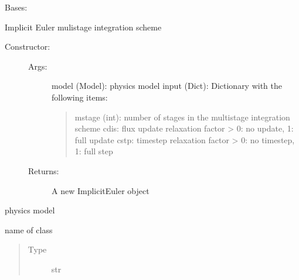 \documentclass[letterpaper,10pt,english]{sphinxmanual}
\begin{document}
\begin{fulllineitems}
\label{\detokenize{autoapi/ImplicitEuler/index:ImplicitEuler.ImplicitEuler}}
\sphinxAtStartPar
Bases: 

\sphinxAtStartPar
Implicit Euler mulistage integration scheme
\begin{description}
\item[{Constructor:}] \leavevmode\begin{description}
\item[{Args:}] \leavevmode
\sphinxAtStartPar
model (Model): physics model
input (Dict): Dictionary with the following items:
\begin{quote}

\sphinxAtStartPar
mstage (int):   number of stages in the multistage integration scheme
cdis:           flux update relaxation factor \textendash{}\textgreater{} 0: no update, 1: full update
cstp:           timestep relaxation factor \textendash{}\textgreater{} 0: no timestep, 1: full step
\end{quote}

\item[{Returns:}] \leavevmode
\sphinxAtStartPar
A new ImplicitEuler object

\end{description}

\end{description}

\begin{fulllineitems}
\label{\detokenize{autoapi/ImplicitEuler/index:ImplicitEuler.ImplicitEuler.Model}}
\sphinxAtStartPar
physics model

\end{fulllineitems}


\begin{fulllineitems}
\label{\detokenize{autoapi/ImplicitEuler/index:ImplicitEuler.ImplicitEuler.className}}
\sphinxAtStartPar
name of class
\begin{quote}\begin{description}
\item[{Type}] \leavevmode
\sphinxAtStartPar
str


\end{description}
\end{quote}
\end{fulllineitems}
\end{fulllineitems}
\end{document}
